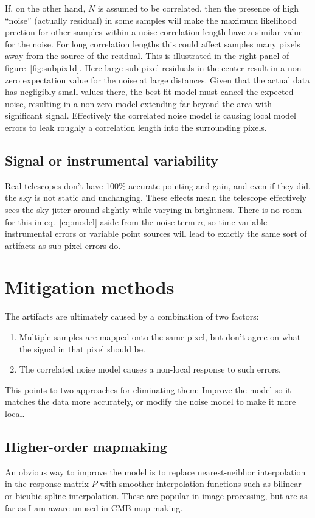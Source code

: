 \documentclass{article}
\begin{document}
If, on the other hand, $N$ is assumed to be correlated, then the presence of high
``noise'' (actually residual) in some samples
will make the maximum likelihood prection for other samples within a noise correlation length
have a similar value for the noise. For long correlation lengths this could affect samples
many pixels away from the source of the residual. This is illustrated in the right panel
of figure~\ref{fig:subpix1d}. Here large sub-pixel residuals in the center result in a non-zero expectation
value for the noise at large distances. Given that the actual data has negligibly small values
there, the best fit model must cancel the expected noise, resulting in a non-zero model
extending far beyond the area with significant signal. Effectively the correlated
noise model is causing local model errors to leak roughly a correlation length
into the surrounding pixels.

\subsection{Signal or instrumental variability}
\label{sect:inconsistency}
Real telescopes don't have 100\% accurate pointing and gain, and even if they did, the
sky is not static and unchanging. These effects mean the telescope effectively sees the
sky jitter around slightly while varying in brightness. There is no room for this in
eq.~\ref{eq:model} aside from the noise term $n$, so time-variable instrumental errors
or variable point sources will lead to exactly the same sort of artifacts as sub-pixel errors do.

\section{Mitigation methods}
The artifacts are ultimately caused by a combination of two factors:
\begin{enumerate}
	\item Multiple samples are mapped onto the same pixel, but don't agree on what the
		signal in that pixel should be.
	\item The correlated noise model causes a non-local response to such errors.
\end{enumerate}
This points to two approaches for eliminating them: Improve the model so it matches
the data more accurately, or modify the noise model to make it more local.

\subsection{Higher-order mapmaking}
An obvious way to improve the model is to replace nearest-neibhor interpolation in 
the response matrix $P$
with smoother interpolation functions such as bilinear or bicubic spline interpolation.
These are popular in image processing, but are as far as I am aware unused in CMB map making.
\end{document}
